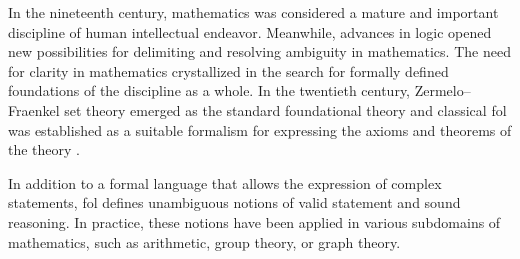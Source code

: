 
In the nineteenth century, mathematics was considered a mature and important discipline of human intellectual endeavor.
Meanwhile,
advances in logic opened new possibilities
for delimiting and resolving
ambiguity in mathematics.
The need for clarity in mathematics
crystallized in the search for formally defined foundations of the discipline as a whole.
In the twentieth century, Zermelo--Fraenkel set theory emerged as the standard foundational theory
and classical \gls{fol} was established as a suitable formalism for expressing the axioms and theorems of the theory \cite{DBLP:journals/bsl/Ferreiros01}.



In addition to a formal language that allows the expression of complex statements,
\gls{fol} defines unambiguous notions of valid statement and sound reasoning.
In practice, these notions have been applied in various subdomains of mathematics, such as arithmetic, group theory, or graph theory.

